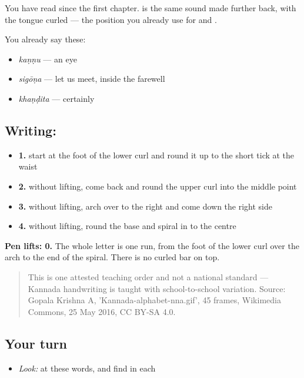 You have read \textbf{} since the first chapter. \textbf{} is the same sound made further back, with the tongue curled — the position you already use for \textbf{} and \textbf{}.

You already say these:

\begin{itemize}
\raggedright
  \item \textbf{} \emph{kaṇṇu} — an eye
  \item \textbf{} \emph{sigōṇa} — let us meet, inside the farewell
  \item \textbf{} \emph{khaṇḍita} — certainly
\end{itemize}

\subsection*{Writing: }

\begin{itemize}
\raggedright
  \item \textbf{1.} start at the foot of the lower curl and round it up to the short tick at the waist
  \item \textbf{2.} without lifting, come back and round the upper curl into the middle point
  \item \textbf{3.} without lifting, arch over to the right and come down the right side
  \item \textbf{4.} without lifting, round the base and spiral in to the centre
\end{itemize}

\textbf{Pen lifts: 0.} The whole letter is one run, from the foot of the lower curl over the arch to the end of the spiral. There is no curled bar on top.

\begin{quote}
This is one attested teaching order and not a national standard — Kannada handwriting is taught with school-to-school variation. Source: Gopala Krishna A, 'Kannada-alphabet-nna.gif', 45 frames, Wikimedia Commons, 25 May 2016, CC BY-SA 4.0.
\end{quote}

\subsection*{Your turn}
\begin{itemize}
\raggedright
  \item \emph{Look:} at these words, and find  in each
\end{itemize}

